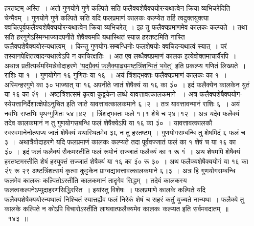 \documentclass[11pt, openany]{book}
\begin{document}
\begin{sloppypar}
\noindent हरतष्टम् अस्ति~। अतो गुणयोगे गुणे कल्पिते सति फलैक्यशेषैक्ययोरन्यथात्वेन क्रिया व्यभिचरेदिति चेन्मैवम्~। गुणयोगे गुणे कल्पिते सति यदि फलप्रमाणं कालकः कल्प्येत तर्हि त्वदुक्तयुक्त्या क्वचित्पूर्वफलैक्यशेषैक्ययोरन्यथात्वेन क्रिया व्यभिचरेत्~। इह तु फलैक्यप्रमाणमेव कालकः कल्प्यते~। तथा सति हरगुणेऽस्मिन्भाज्यादपनीते शेषैक्यमपि यथास्थितं स्यान्न हरतष्टमिति नास्ति फलैक्यशेषैक्ययोरन्यथात्वम्~। किन्तु गुणयोग-सम्बन्धिनोः फलशेषयोः क्वचिदन्यथात्वं स्यात्~। परं तस्यानपेक्षितत्वादन्यथात्वेऽपि न काचित्क्षतिः~। अत एव लब्धैक्यप्रमाणं कालक इत्येवोक्तमाचार्यैरपि~।\\

अथात्र प्रतीत्यर्थमस्मिन्नेवोदाहरणे \hyperref[9.143]{'यदग्रैक्यं फलैक्याढ्यमष्टत्रिंशन्मितं भवेत्'} इति प्रकल्प्य गणितं लिख्यते~। राशिः या १~। गुणयोगेन १६ गुणितः या १६~। अयं त्रिंशद्भक्तः फलैक्यप्रमाणं कालकः का १~। अस्मिन्हरगुणे का ३० भाज्यात् या १६ अपनीते जातं शेषैक्यं या १६ का ३ं०~। इदं फलैक्येन कालकेन युतं या १६ का २ं९~। अष्टत्रिंशत्समं कृत्वा कुट्टकेन लब्धे यावत्तावत्कालकमाने ~। अत्र फलैक्यशेषैक्ययोग-स्येयत्तानिर्देशात्क्षेपोऽनुचित इति जाते यावत्तावत्कालकमाने ६।२~। तत्र यावत्तावन्मानं राशिः ६~। अयं नवभिः सप्तभिः पृथग्गुणितः ५४।४२~। त्रिंशद्भक्तः फले १।१ शेषे च २४।१२~। अत्र यदेव फलैक्यं तदेव कालकमानं न तु गुणयोगसबन्धि फलं शेषैक्येऽपि या १६ का ३ं०~। यावत्तावत्कालकौ स्वस्वमानेनोत्थाप्य जातं शेषैक्यं यथास्थितमेव ३६ न तु हरतष्टम्~। गुणयोगसम्बन्धि तु शेषमिदं ६ फलं च ३~। अथात्रैवोदाहरणे यदि फलप्रमाणं कालकः कल्प्यते तदा पूर्ववज्जातं फलं का १ शेषं च या १६ का ३ं०~। इदं फलं फलैक्यं सैकमस्तीति फलं रूपोनं सज्जातं फलैक्यं का १ रू १ं~। अथ शेषमपि शेषैक्यं हरतष्टमस्तीति शेषं हरयुक्तं सज्जातं शेषैक्यं या १६ का ३ं० रू ३०~। अथ फलैक्यशेषैक्ययोगं या १६ का २ं९ रू २९ अष्टत्रिंशत्समं कृत्वा कुट्टकेन प्राग्वद्यावत्तावत्कालकमाने ६।३~। अत्र हि गुणयोगसम्बन्धि फलमेव कालकः कल्पितोऽस्तीति कालकमानं तादृगेव सिद्धम्~। तदेवं कालकस्य फलत्वकल्पनेऽप्युदाहरणसिद्धिरस्ति~। इयांस्तु विशेषः~। फलप्रमाणे कालके कल्पिते यदि फलैक्यशेषैक्ययोरन्यथात्वं निश्चितं स्यात्तर्ह्येव फलं निरेकं शेषं च सहरं कर्तुं युज्यते नान्यथा~। फलैक्ये तु कालके कल्पिते न कोऽपि विचारोऽस्तीति लाघवात्फलैक्यमेव कालकः कल्प्यत इति सर्वमवदातम्~॥~१४३~॥
\end{sloppypar}
\end{document}
